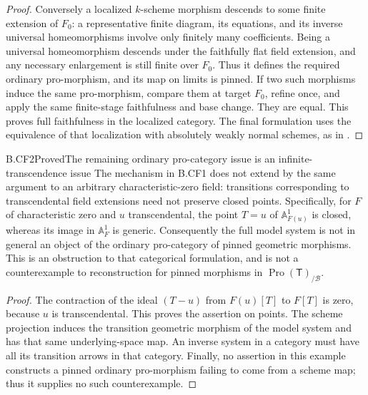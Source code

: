 \begin{proof}
Conversely a localized \(k\)-scheme morphism descends to some finite
extension of \(F_0\): a representative finite diagram, its equations,
and its inverse universal homeomorphisms involve only finitely many
coefficients. Being a universal homeomorphism descends under the
faithfully flat field extension, and any necessary enlargement is
still finite over \(F_0\). Thus it defines the required ordinary
pro-morphism, and its map on limits is pinned. If two such morphisms
induce the same pro-morphism, compare them at target \(F_0\), refine
once, and apply the same finite-stage faithfulness and base change.
They are equal. This proves full faithfulness in the localized
category. The final formulation uses the equivalence of that
localization with absolutely weakly normal schemes, as in
\citep[Theorem~1.13, Lemma~1.32, Proposition~2.28]{CarlsonHaineWolf2024}.
\end{proof}

\begin{claim}{B.CF2}{Proved}{The remaining ordinary pro-category issue is an infinite-transcendence issue}
The mechanism in B.CF1 does not extend by the same argument to an
arbitrary characteristic-zero field: transitions corresponding to
transcendental field extensions need not preserve closed points.
Specifically, for \(F\) of characteristic zero and \(u\) transcendental,
the point \(T=u\) of \(\mathbb A^1_{F(u)}\) is closed, whereas its
image in \(\mathbb A^1_F\) is generic. Consequently the full model
system is not in general an object of the ordinary pro-category of
pinned geometric morphisms. This is an obstruction to that categorical
formulation, and is not a counterexample to reconstruction for pinned
morphisms in \(\operatorname{Pro}(\mathsf T)_{/\mathcal B}\).
\end{claim}
\begin{proof}
The contraction of the ideal \((T-u)\) from \(F(u)[T]\) to \(F[T]\)
is zero, because \(u\) is transcendental. This proves the assertion
on points. The scheme projection induces the transition geometric
morphism of the model system and has that same underlying-space map.
An inverse system in a category must have all its transition arrows
in that category. Finally, no assertion in this example constructs
a pinned ordinary pro-morphism failing to come from a scheme map;
thus it supplies no such counterexample.
\end{proof}

